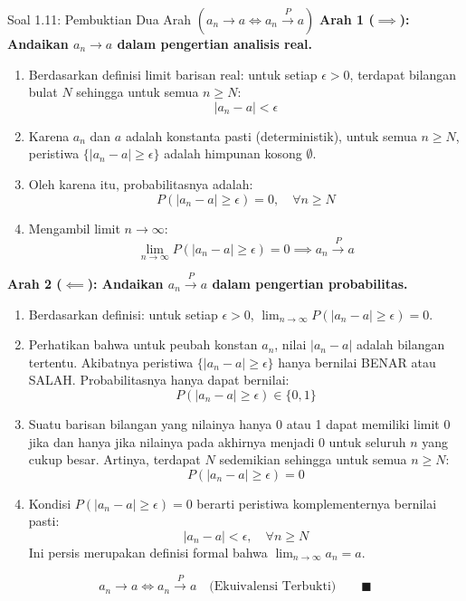 \documentclass[10pt,twoside]{article}
\begin{document}
\begin{solbox}{Soal 1.11: Pembuktian Dua Arah $(a_n \to a \iff a_n \xrightarrow{P} a)$}
\textbf{Arah 1 ($\implies$): Andaikan $a_n \to a$ dalam pengertian analisis real.}
\begin{enumerate}[label=\arabic*.]
  \item Berdasarkan definisi limit barisan real: untuk setiap $\epsilon > 0$, terdapat bilangan bulat $N$ sehingga untuk semua $n \ge N$:
  \[
  |a_n - a| < \epsilon
  \]
  \item Karena $a_n$ dan $a$ adalah konstanta pasti (deterministik), untuk semua $n \ge N$, peristiwa $\{|a_n - a| \ge \epsilon\}$ adalah himpunan kosong $\emptyset$.
  \item Oleh karena itu, probabilitasnya adalah:
  \[
  P(|a_n - a| \ge \epsilon) = 0, \quad \forall n \ge N
  \]
  \item Mengambil limit $n \to \infty$:
  \[
  \lim_{n \to \infty} P(|a_n - a| \ge \epsilon) = 0 \implies a_n \xrightarrow{P} a
  \]
\end{enumerate}

\textbf{Arah 2 ($\impliedby$): Andaikan $a_n \xrightarrow{P} a$ dalam pengertian probabilitas.}
\begin{enumerate}[label=\arabic*.]
  \item Berdasarkan definisi: untuk setiap $\epsilon > 0$, $\lim_{n \to \infty} P(|a_n - a| \ge \epsilon) = 0$.
  \item Perhatikan bahwa untuk peubah konstan $a_n$, nilai $|a_n - a|$ adalah bilangan tertentu. Akibatnya peristiwa $\{|a_n - a| \ge \epsilon\}$ hanya bernilai BENAR atau SALAH. Probabilitasnya hanya dapat bernilai:
  \[
  P(|a_n - a| \ge \epsilon) \in \{0, 1\}
  \]
  \item Suatu barisan bilangan yang nilainya hanya 0 atau 1 dapat memiliki limit 0 jika dan hanya jika nilainya pada akhirnya menjadi 0 untuk seluruh $n$ yang cukup besar.
  Artinya, terdapat $N$ sedemikian sehingga untuk semua $n \ge N$:
  \[
  P(|a_n - a| \ge \epsilon) = 0
  \]
  \item Kondisi $P(|a_n - a| \ge \epsilon) = 0$ berarti peristiwa komplementernya bernilai pasti:
  \[
  |a_n - a| < \epsilon, \quad \forall n \ge N
  \]
  Ini persis merupakan definisi formal bahwa $\lim_{n \to \infty} a_n = a$.
\end{enumerate}

\[
\boxed{a_n \to a \iff a_n \xrightarrow{P} a \quad \text{(Ekuivalensi Terbukti)}} \qquad \blacksquare
\]
\end{solbox}
\end{document}
